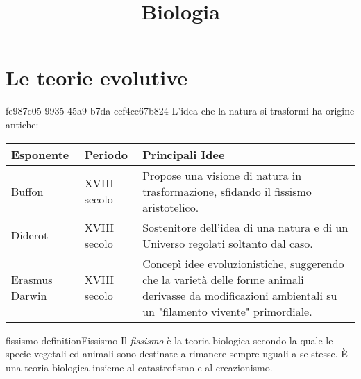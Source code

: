 \documentclass[preview]{standalone}
\begin{document}
\title{Biologia}
\genpage

\section{Le teorie evolutive}

\begin{snippet}{fe987c05-9935-45a9-b7da-cef4ce67b824}
    L'idea che la natura si trasformi ha origine antiche: \\
    \begin{table}[htbp]
        \centering
        \begin{tabularx}{0.85\textwidth}{|l|l|X|}
            \hline 
            Esponente & Periodo & Principali Idee \\
            \hline 
            Buffon & XVIII secolo & Propose una visione di natura in trasformazione, sfidando il fissismo aristotelico. \\
            \hline 
            Diderot & XVIII secolo & Sostenitore dell'idea di una natura e di un Universo regolati soltanto dal caso. \\
            \hline 
            Erasmus Darwin & XVIII secolo & Concepì idee evoluzionistiche, suggerendo che la varietà delle forme animali derivasse da modificazioni ambientali su un "filamento vivente" primordiale. \\
            \hline
        \end{tabularx}
    \end{table}
    \vspace{0.25cm}
\end{snippet}

\begin{snippetdefinition}{fissismo-definition}{Fissismo}
    Il \textit{fissismo} è la teoria biologica secondo la quale le specie vegetali ed animali sono destinate a rimanere sempre uguali a se stesse. È una teoria biologica insieme al catastrofismo e al creazionismo. 
\end{snippetdefinition}
\end{document}
